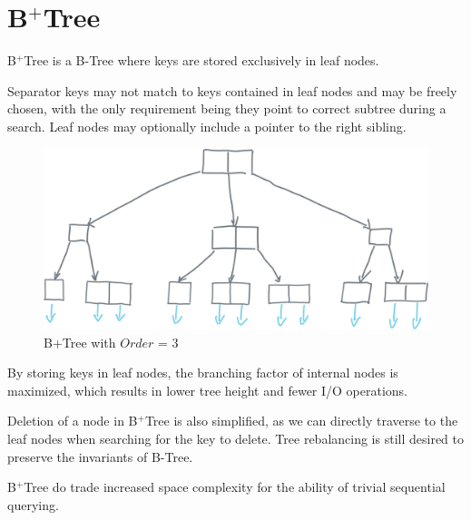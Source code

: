 \section{B$^+$Tree}

\begin{definition}
  B$^+$Tree is a B-Tree where keys are stored exclusively in leaf nodes.
\end{definition}

Separator keys may not match to keys contained in leaf nodes and may be freely chosen, with the only requirement being they point to correct subtree during a search. Leaf nodes may optionally include a pointer to the right sibling.

\begin{figure}[H]
  \centering
  \includegraphics[width=\textwidth]{components/figure/b+tree.png}
  \caption{B+Tree with $Order$ = 3}
  \label{figure:b+tree}
\end{figure}

By storing keys in leaf nodes, the branching factor of internal nodes is maximized, which results in lower tree height and fewer I/O operations.

Deletion of a node in B$^+$Tree is also simplified, as we can directly traverse to the leaf nodes when searching for the key to delete. Tree rebalancing is still desired to preserve the invariants of B-Tree.

B$^+$Tree do trade increased space complexity for the ability of trivial sequential querying.